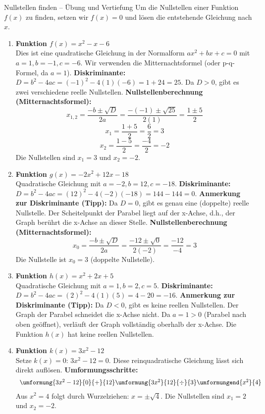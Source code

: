 \begin{loesungsumgebung}{Nullstellen finden – Übung und Vertiefung}
Um die Nullstellen einer Funktion $f(x)$ zu finden, setzen wir $f(x)=0$ und lösen die entstehende Gleichung nach $x$.

\begin{enumerate}[label=(\alph*)]
    \item \textbf{Funktion $f(x) = x^2 - x - 6$} \\
    Dies ist eine quadratische Gleichung in der Normalform $ax^2+bx+c=0$ mit $a=1, b=-1, c=-6$. Wir verwenden die Mitternachtsformel (oder p-q-Formel, da $a=1$).
    \textbf{Diskriminante:} $D = b^2 - 4ac = (-1)^2 - 4(1)(-6) = 1 + 24 = 25$.
    Da $D > 0$, gibt es zwei verschiedene reelle Nullstellen.
    \textbf{Nullstellenberechnung (Mitternachtsformel):}
    $$ x_{1,2} = \frac{-b \pm \sqrt{D}}{2a} = \frac{-(-1) \pm \sqrt{25}}{2(1)} = \frac{1 \pm 5}{2} $$
    $$ x_1 = \frac{1+5}{2} = \frac{6}{2} = 3 $$
    $$ x_2 = \frac{1-5}{2} = \frac{-4}{2} = -2 $$
    Die Nullstellen sind $x_1=3$ und $x_2=-2$.

    \item \textbf{Funktion $g(x) = -2x^2 + 12x - 18$} \\
    Quadratische Gleichung mit $a=-2, b=12, c=-18$.
    \textbf{Diskriminante:} $D = b^2 - 4ac = (12)^2 - 4(-2)(-18) = 144 - 144 = 0$.
    \textbf{Anmerkung zur Diskriminante (Tipp):} Da $D=0$, gibt es genau eine (doppelte) reelle Nullstelle. Der Scheitelpunkt der Parabel liegt auf der x-Achse, d.h., der Graph berührt die x-Achse an dieser Stelle.
    \textbf{Nullstellenberechnung (Mitternachtsformel):}
    $$ x_0 = \frac{-b \pm \sqrt{D}}{2a} = \frac{-12 \pm \sqrt{0}}{2(-2)} = \frac{-12}{-4} = 3 $$
    Die Nullstelle ist $x_0=3$ (doppelte Nullstelle).

    \item \textbf{Funktion $h(x) = x^2 + 2x + 5$} \\
    Quadratische Gleichung mit $a=1, b=2, c=5$.
    \textbf{Diskriminante:} $D = b^2 - 4ac = (2)^2 - 4(1)(5) = 4 - 20 = -16$.
    \textbf{Anmerkung zur Diskriminante (Tipp):} Da $D < 0$, gibt es keine reellen Nullstellen. Der Graph der Parabel schneidet die x-Achse nicht. Da $a=1>0$ (Parabel nach oben geöffnet), verläuft der Graph vollständig oberhalb der x-Achse.
    Die Funktion $h(x)$ hat keine reellen Nullstellen.

    \item \textbf{Funktion $k(x) = 3x^2 - 12$} \\
    Setze $k(x)=0$: $3x^2 - 12 = 0$. Diese reinquadratische Gleichung lässt sich direkt auflösen.
    \textbf{Umformungsschritte:}
    $$
    \begin{array}{r c l c l}
    \umformung{3x^2 - 12}{0}{+}{12}
    \umformung{3x^2}{12}{\div}{3}
    \umformungend{x^2}{4}
    \end{array}
    $$
    Aus $x^2=4$ folgt durch Wurzelziehen: $x = \pm\sqrt{4}$.
    Die Nullstellen sind $x_1=2$ und $x_2=-2$.


\end{enumerate}
\end{loesungsumgebung}
